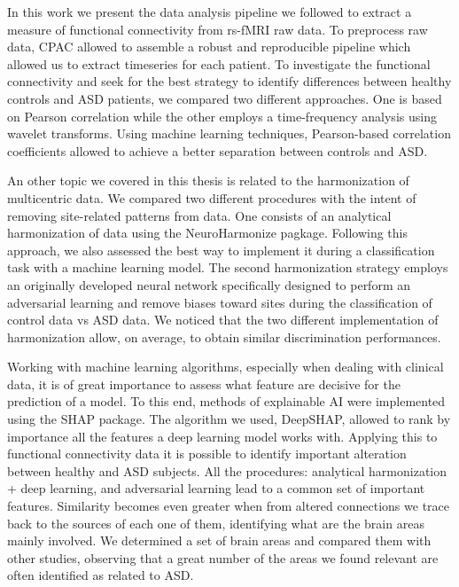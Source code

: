 \documentclass[11pt]{report}
\begin{document}
In this work we present the data analysis pipeline we followed to
extract a measure of functional connectivity from rs-fMRI raw data.
To preprocess raw data, CPAC allowed to assemble a robust and reproducible pipeline which allowed us to extract timeseries for each patient.
To investigate the functional connectivity and seek for the best strategy to identify differences between healthy controls and ASD patients, we compared two different approaches.
One is based on Pearson correlation while the other employs a time-frequency analysis using wavelet transforms.
Using machine learning techniques, Pearson-based correlation coefficients allowed to achieve a better separation between controls and ASD. 

An other topic we covered in this thesis is related to the harmonization of multicentric data.
We compared two different procedures with the intent of removing site-related patterns from data.
One consists of an analytical harmonization of data using the NeuroHarmonize pagkage.
Following this approach, we also assessed the best way to implement it during a classification task with a machine learning model.
The second harmonization strategy employs an originally developed neural network specifically designed to perform an adversarial learning and remove biases toward sites during the classification of control data vs ASD data.
We noticed that the two different implementation of harmonization allow, on average, to obtain similar discrimination performances.

Working with machine learning algorithms, especially when dealing with clinical data, it is of great importance to assess what feature are decisive for the prediction of a model.
To this end, methods of explainable AI were implemented using the SHAP package.
The algorithm we used, DeepSHAP, allowed to rank by importance all the features a deep learning model works with.
Applying this to functional connectivity data it is possible to identify important alteration between healthy and ASD subjects.
All the procedures: analytical harmonization + deep learning, and adversarial learning lead to a common set of important features.
Similarity becomes even greater when from altered connections we trace back to the sources of each one of them, identifying what are the brain areas mainly involved.
We determined a set of brain areas and compared them with other studies, observing that a great number of the areas we found relevant are often identified as related to ASD.
\end{document}

